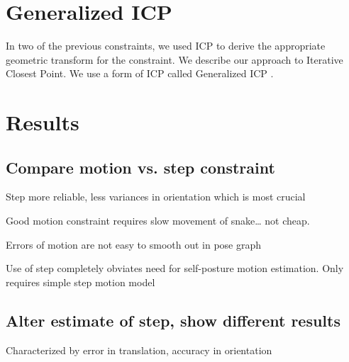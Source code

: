 \section{Generalized ICP}

In two of the previous constraints, we used ICP to derive the appropriate geometric transform for the constraint.  We describe our approach to Iterative Closest Point.  We use a form of ICP called Generalized ICP \cite{}.



\section{Results}

\subsection{Compare motion vs. step constraint}

Step more reliable, less variances in orientation which is most crucial

Good motion constraint requires slow movement of snake… not cheap.

Errors of motion are not easy to smooth out in pose graph

Use of step completely obviates need for self-posture motion estimation.  Only requires simple step motion model

\subsection{Alter estimate of step, show different results}

Characterized by error in translation, accuracy in orientation

